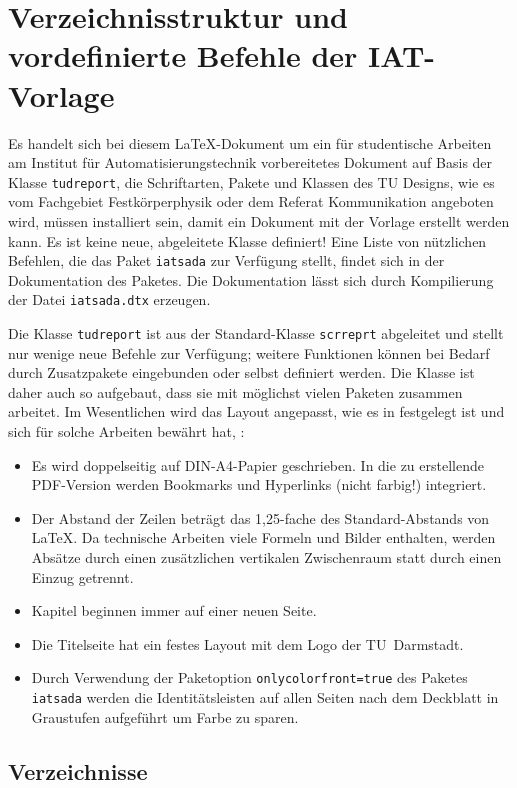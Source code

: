 \chapter{Verzeichnisstruktur und vordefinierte Befehle der IAT-Vorlage}
\label{cha:Verzeichnisstruktur}
Es handelt sich bei diesem \LaTeX-Dokument um ein für studentische Arbeiten am Institut für Automatisierungstechnik vorbereitetes Dokument auf Basis der Klasse \verb|tudreport|, \dah die Schriftarten, Pakete und Klassen des TU Designs, wie es vom Fachgebiet Festkörperphysik oder dem Referat Kommunikation angeboten wird, müssen installiert sein, damit ein Dokument mit der Vorlage erstellt werden kann.
Es ist keine neue, abgeleitete Klasse definiert!
Eine Liste von nützlichen Befehlen, die das Paket \texttt{iatsada} zur Verfügung stellt, findet sich in der Dokumentation des Paketes.
Die Dokumentation lässt sich durch Kompilierung der Datei \texttt{iatsada.dtx} erzeugen.

Die Klasse \verb|tudreport| ist aus der Standard-Klasse \verb|scrreprt| abgeleitet und stellt nur wenige neue Befehle zur Verfügung; weitere Funktionen können bei
Bedarf durch Zusatzpakete eingebunden oder selbst definiert werden.
Die Klasse ist daher auch so aufgebaut, dass sie mit möglichst vielen Paketen zusammen arbeitet.
Im Wesentlichen wird das Layout angepasst, wie es in \cite{Richtlinien} festgelegt ist und sich für solche Arbeiten bewährt hat, \zB:
\begin{itemize}
	\item Es wird doppelseitig auf DIN-A4-Papier geschrieben.
	In die zu erstellende PDF-Version werden Bookmarks und Hyperlinks (nicht farbig!) integriert.
	\item Der Abstand der Zeilen beträgt das 1,25-fache des Standard-Abstands von \LaTeX.
	Da technische Arbeiten viele Formeln und Bilder enthalten, werden Absätze durch einen zusätzlichen vertikalen Zwischenraum statt durch einen Einzug getrennt.
	\item Kapitel beginnen immer auf einer neuen Seite.
	\item Die Titelseite hat ein festes Layout mit dem Logo der TU~Darmstadt.
	\item Durch Verwendung der Paketoption \texttt{onlycolorfront=true} des Paketes \texttt{iatsada} werden die Identitätsleisten auf allen Seiten nach dem Deckblatt in Graustufen aufgeführt um Farbe zu sparen.
\end{itemize}
%
%
\section{Verzeichnisse}

